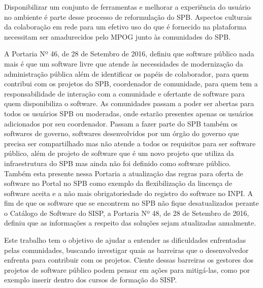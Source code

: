Disponibilizar um conjunto de ferramentas e melhorar a experiência do usuário no 
ambiente é parte desse processo de reformulação do SPB. Aspectos culturais 
da colaboração em rede para um efetivo uso do que é fornecido na plataforma 
necessitam ser amadurecidos pelo MPOG junto às comunidades do SPB.

A Portaria Nº 46, de 28 de Setembro de 2016, definiu que software público nada mais é
que um software livre que atende às necessidades de modernização da administração 
pública além de identificar os papéis de colaborador, para quem contribui com os projetos do SPB, 
coordenador de comunidade, para quem tem a responsabilidade de interação com a comunidade e 
ofertante de software para quem disponibiliza o software. As comunidades passam a poder
ser abertas para todos os usuários SPB ou moderadas, onde estarão presentes apenas os 
usuários adicionados por seu coordenador. Passam a fazer parte do SPB também os 
softwares de governo, softwares desenvolvidos por um órgão do governo que precisa ser
compartilhado mas não atende a todos os requisitos para ser software público, além de projeto de
software que é um novo projeto que utiliza da infraestrutura do SPB mas ainda não
foi definido como software público.
% 
Também esta presente nessa Portaria a atualização das
regras para oferta de software no Portal no SPB como exemplo da flexibilização
da lincença de software aceita e a não mais obrigatoriedade do registro do 
software no INPI. 
%
A fim de que os software que se encontrem no SPB não fique desatualizados perante
o Catálogo de Software do SISP, a Portaria Nº 48, de 28 de Setembro de 2016, definiu que 
as informações a respeito das soluções sejam atualizadas anualmente.

Este trabalho tem o objetivo de ajudar a entender as dificuldades enfrentadas
pelas comunidades, buscando investigar quais as barreiras que o desenvolvedor 
enfrenta para contribuir com os projetos. Ciente dessas barreiras os gestores 
dos projetos de software público podem pensar em ações para mitigá-las, como 
por exemplo inserir dentro dos cursos de formação do SISP.

